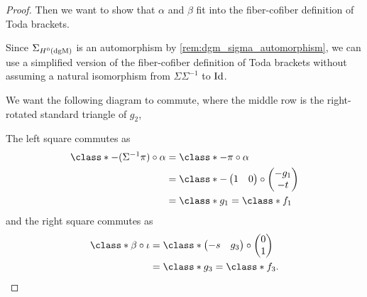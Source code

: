 \begin{proof}
    Then we want to show that \( \alpha \) and \( \beta \) fit into the fiber-cofiber definition of Toda brackets.

    Since \( \Sigma_{H^0(\operatorname{dgM})} \) is an automorphism by \autoref{rem:dgm_sigma_automorphism}, we can use a simplified version of the fiber-cofiber definition of Toda brackets without assuming a natural isomorphism from \( \Sigma \Sigma^{-1} \) to \( \operatorname{Id} \).

    We want the following diagram to commute, where the middle row is the right-rotated standard triangle of \( g_2 \),
    \begin{center}
    \end{center}

    The left square commutes as
    \begin{align*}
        \class*{- (\Sigma^{-1} \pi) \circ \alpha} &= \class*{- \pi \circ \alpha} \\
        &=
        \class*{
            -
            \begin{pmatrix}
                1 & 0
            \end{pmatrix}
            \circ
            \begin{pmatrix}
                - g_1 \\
                - t
            \end{pmatrix} 
        } \\
        &= \class*{g_1} = \class*{f_1}
    \end{align*}
    and the right square commutes as
    \begin{align*}
        \class*{\beta \circ \iota} &=
        \class*{
            \begin{pmatrix}
                - s & g_3
            \end{pmatrix}
            \circ
            \begin{pmatrix}
                0 \\
                1
            \end{pmatrix}
         } \\
        &= \class*{g_3} = \class*{f_3}.
    \end{align*}


\end{proof}
